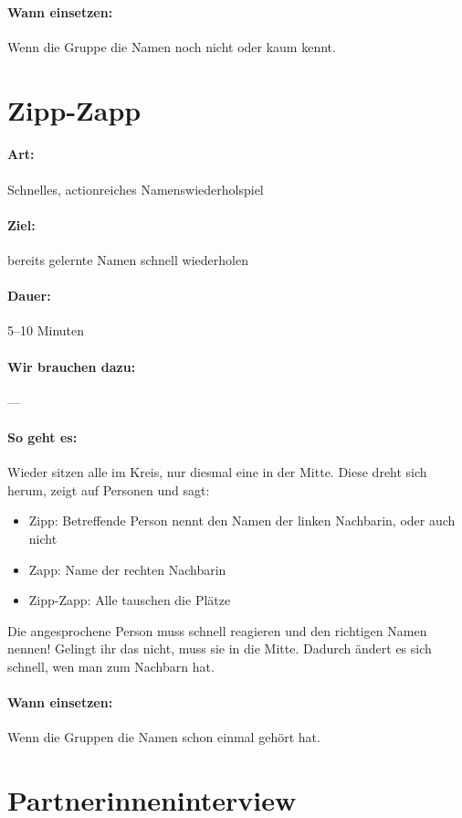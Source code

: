 \paragraph{Wann einsetzen:} Wenn die Gruppe die Namen noch nicht oder kaum kennt.

\section{Zipp-Zapp}
\paragraph{Art:} Schnelles, actionreiches Namenswiederholspiel
\paragraph{Ziel:} bereits gelernte Namen schnell wiederholen
\paragraph{Dauer:} 5--10 Minuten
\paragraph{Wir brauchen dazu:} ---
\paragraph{So geht es:}
Wieder sitzen alle im Kreis, nur diesmal eine in der Mitte. Diese dreht sich herum, zeigt auf Personen und sagt:
\begin{itemize}
\item Zipp: Betreffende Person nennt den Namen der linken Nachbarin, oder auch nicht
\item Zapp: Name der rechten Nachbarin
\item Zipp-Zapp: Alle tauschen die Plätze
\end{itemize}
Die angesprochene Person muss schnell reagieren und den richtigen Namen nennen! Gelingt ihr das nicht, muss sie in die Mitte. Dadurch ändert es sich schnell, wen man zum Nachbarn hat.
\paragraph{Wann einsetzen:} Wenn die Gruppen die Namen schon einmal gehört hat.

\section{Partnerinneninterview}

